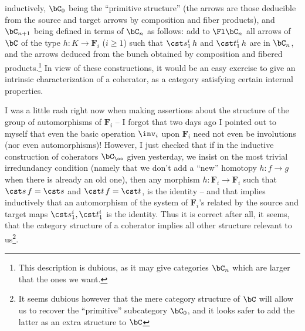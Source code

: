 inductively, $\bC_0$ being the ``primitive structure'' (the arrows
are those deducible from the source and target arrows by composition
and fiber products), and $\bC_{n+1}$ being defined in terms of
$\bC_n$ as follows: add to $\Fl \bC_n$ all arrows of $\bC$ of
the type $h: K \to \boldsymbol F_i$ ($i\ge1$) such that $\cst s_1^i\, h$ and
$\cst t_1^i\,h$ are in $\bC_n$, and the arrows deduced from the
bunch obtained by composition and fibered products.\footnote{This description is dubious, as it may give categories $\bC_n$ which are larger that the ones we want.} In view of
these constructions, it would be an easy exercise to give an intrinsic
characterization of a coherator, as a category satisfying certain
internal properties.

I was a little rash right now when making assertions about the
structure of the group of automorphisms of $\boldsymbol F_i$ -- I forgot that
two days ago I pointed out to myself that even the basic operation
$\inv_i$ upon $\boldsymbol F_i$ need not even be involutions (nor
  even automorphisms)! However, I just checked that if in the inductive
construction of coherators $\bC_\oo$ given yesterday, we insist on
the most trivial irredundancy condition (namely that we don't add a
``new'' homotopy $h: f\to g$ when there is already an old one), then
any morphism $h: \boldsymbol F_i \to \boldsymbol F_i$ such that $\cst s\,f=\cst s$
and $\cst t\,f=\cst t$, is the identity -- and that
implies inductively that an automorphism of the system of $\boldsymbol F_i$'s
related by the source and target maps $\cst s_1^i,\cst t_1^i$ is the
identity. Thus it is correct after all, it seems, that the category
structure of a coherator implies all other structure relevant to
us\footnote{It seems dubious however that the mere category structure of $\bC$ will allow us to recover the ``primitive'' subcategory $\bC_0$, and it looks safer to add the latter as an extra structure to $\bC$}.

